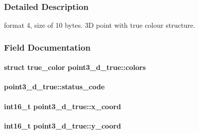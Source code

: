 \subsubsection{Detailed Description}
format 4, size of 10 bytes. 3D point with true colour structure. 

\subsubsection{Field Documentation}
\paragraph[{\texorpdfstring{colors}{colors}}]{\setlength{\rightskip}{0pt plus 5cm}struct {\bf true\+\_\+color} point3\+\_\+d\+\_\+true\+::colors}\hypertarget{structpoint3__d__true_a439d36e90be604aea553da6d944c4173}{}\label{structpoint3__d__true_a439d36e90be604aea553da6d944c4173}
\paragraph[{\texorpdfstring{status\+\_\+code}{status_code}}]{ point3\+\_\+d\+\_\+true\+::status\+\_\+code}\hypertarget{structpoint3__d__true_a05766432b1037ce6ddb34874df3245d7}{}\label{structpoint3__d__true_a05766432b1037ce6ddb34874df3245d7}
\paragraph[{\texorpdfstring{x\+\_\+coord}{x_coord}}]{\setlength{\rightskip}{0pt plus 5cm}int16\+\_\+t point3\+\_\+d\+\_\+true\+::x\+\_\+coord}\hypertarget{structpoint3__d__true_ae2fecb3111aaa9450526d3a8ac54cc2f}{}\label{structpoint3__d__true_ae2fecb3111aaa9450526d3a8ac54cc2f}
\paragraph[{\texorpdfstring{y\+\_\+coord}{y_coord}}]{\setlength{\rightskip}{0pt plus 5cm}int16\+\_\+t point3\+\_\+d\+\_\+true\+::y\+\_\+coord}\hypertarget{structpoint3__d__true_a3e9e88bc5533d72da6811340ce578f67}{}\label{structpoint3__d__true_a3e9e88bc5533d72da6811340ce578f67}
